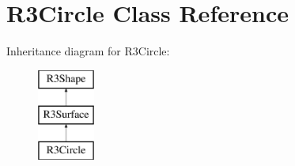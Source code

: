 \hypertarget{class_r3_circle}{}\section{R3\+Circle Class Reference}
\label{class_r3_circle}
Inheritance diagram for R3\+Circle\+:\begin{figure}[H]
\begin{center}
\leavevmode
\includegraphics[height=3.000000cm]{class_r3_circle}
\end{center}
\end{figure}
